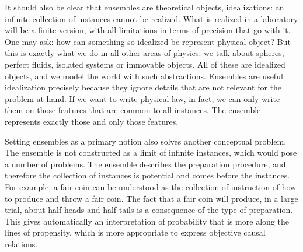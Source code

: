 It should also be clear that ensembles are theoretical objects, idealizations: an infinite collection of instances cannot be realized. What is realized in a laboratory will be a finite version, with all limitations in terms of precision that go with it. One may ask: how can something so idealized be represent physical object? But this is exactly what we do in all other areas of physics: we talk about spheres, perfect fluids, isolated systems or immovable objects. All of these are idealized objects, and we model the world with such abstractions. Ensembles are useful idealization precisely because they ignore details that are not relevant for the problem at hand. If we want to write physical law, in fact, we can only write them on those features that are common to all instances. The ensemble represents exactly those and only those features.

Setting ensembles as a primary notion also solves another conceptual problem. The ensemble is not constructed as a limit of infinite instances, which would pose a number of problems. The ensemble describes the preparation procedure, and therefore the collection of instances is potential and comes before the instances. For example, a fair coin can be understood as the collection of instruction of how to produce and throw a fair coin. The fact that a fair coin will produce, in a large trial, about half heads and half tails is a consequence of the type of preparation. This gives automatically an interpretation of probability that is more along the lines of propensity, which is more appropriate to express objective causal relations.

